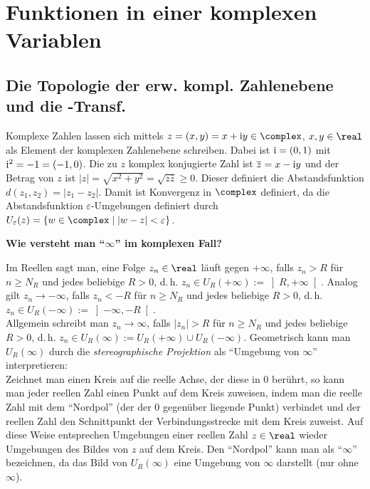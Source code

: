 \chapter{%
    Funktionen in einer komplexen Variablen%
}

\section{%
    Die Topologie der erw. kompl. Zahlenebene und die
    -Transf.%
}

Komplexe Zahlen lassen sich mittels $z = (x, y) = x + \i y \in \complex$,
$x, y \in \real$
als Element der komplexen Zahlenebene schreiben.
Dabei ist $\mathrm{i} = (0, 1)$ mit $\mathrm{i}^2 = -1 = (-1, 0)$.
Die zu $z$ komplex konjugierte Zahl ist $\overline{z} = x - \mathrm{i} y$ und
der Betrag von $z$ ist $|z| = \sqrt{x^2 + y^2} = \sqrt{z \overline{z}} \ge 0$.
Dieser definiert die Abstandsfunktion $d(z_1, z_2) = |z_1 - z_2|$.
Damit ist Konvergenz in $\complex$ definiert, da die Abstandsfunktion
$\varepsilon$-Umgebungen definiert durch
$U_\varepsilon(z) = \{w \in \complex \;|\; |w - z| < \varepsilon\}$.

\linie

\textbf{Wie versteht man "`$\infty$"' im komplexen Fall?}

Im Reellen sagt man, eine Folge $z_n \in \real$ läuft gegen $+\infty$,
falls $z_n > R$ für $n \ge N_R$ und jedes beliebige $R> 0$, d.\,h.
$z_n \in U_R(+\infty) := \left]R, +\infty\right[$.
Analog gilt $z_n \to -\infty$,
falls $z_n < -R$ für $n \ge N_R$ und jedes beliebige $R > 0$, d.\,h.
$z_n \in U_R(-\infty) := \left]-\infty, -R\right[$.\\
Allgemein schreibt man $z_n \to \infty$,
falls $|z_n| > R$ für $n \ge N_R$ und jedes beliebige $R > 0$, d.\,h.
$z_n \in U_R(\infty) := U_R(+\infty) \cup U_R(-\infty)$.
Geometrisch kann man $U_R(\infty)$ durch die \emph{stereographische Projektion}
als "`Umgebung von $\infty$"' interpretieren:\\
Zeichnet man einen Kreis auf die reelle Achse, der diese in $0$ berührt, so
kann man jeder reellen Zahl einen Punkt auf dem Kreis zuweisen,
indem man die reelle Zahl mit dem "`Nordpol"'
(der der $0$ gegenüber liegende Punkt) verbindet und der reellen Zahl
den Schnittpunkt der Verbindungsstrecke mit dem Kreis zuweist.
Auf diese Weise entsprechen Umgebungen einer reellen Zahl $z \in \real$
wieder Umgebungen des Bildes von $z$ auf dem Kreis.
Den "`Nordpol"' kann man als
"`$\infty$"' bezeichnen, da das Bild von $U_R(\infty)$ eine Umgebung von
$\infty$ darstellt (nur ohne $\infty$).

